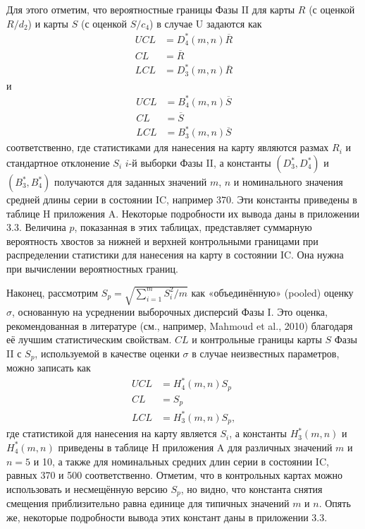 Для этого отметим, что вероятностные границы Фазы II для карты \(R\) (с оценкой \(R/d_2\)) и карты \(S\) (с оценкой \(S/c_4\)) в случае U задаются как
\[
	\begin{aligned}
		UCL &= D_4^*(m,n)\overline{R} \\
		CL &= \overline{R} \\
		LCL &= D_3^*(m,n)\overline{R}
	\end{aligned}
\]
и
\[
	\begin{aligned}
		UCL &= B_4^*(m,n)\overline{S} \\
		CL &= \overline{S} \\
		LCL &= B_3^*(m,n)\overline{S}
	\end{aligned}
\]
соответственно, где статистиками для нанесения на карту являются размах \(R_i\) и стандартное отклонение \(S_i\) \(i\)-й выборки Фазы II, а константы \((D_3^*, D_4^*)\) и \((B_3^*, B_4^*)\) получаются для заданных значений \(m\), \(n\) и номинального значения средней длины серии в состоянии IC, например 370. Эти константы приведены в таблице H приложения A. Некоторые подробности их вывода даны в приложении 3.3. Величина \(p\), показанная в этих таблицах, представляет суммарную вероятность хвостов за нижней и верхней контрольными границами при распределении статистики для нанесения на карту в состоянии IC. Она нужна при вычислении вероятностных границ.

Наконец, рассмотрим \(S_p = \sqrt{\sum_{i=1}^{m} S_i^2/m}\) как «объединённую» (pooled) оценку \(\sigma\), основанную на усреднении выборочных дисперсий Фазы I. Это оценка, рекомендованная в литературе (см., например, Mahmoud et al., 2010) благодаря её лучшим статистическим свойствам. \(CL\) и контрольные границы карты \(S\) Фазы II с \(S_p\), используемой в качестве оценки \(\sigma\) в случае неизвестных параметров, можно записать как
\begin{equation}
	\begin{aligned}
		UCL &= H_4^*(m,n)S_p \\
		CL &= S_p \\
		LCL &= H_3^*(m,n)S_p,
	\end{aligned}
	\label{eq:3.34}
\end{equation}
где статистикой для нанесения на карту является \(S_i\), а константы \(H_3^*(m,n)\) и \(H_4^*(m,n)\) приведены в таблице H приложения A для различных значений \(m\) и \(n = 5\) и 10, а также для номинальных средних длин серии в состоянии IC, равных 370 и 500 соответственно. Отметим, что в контрольных картах можно использовать и несмещённую версию \(S_p\), но видно, что константа снятия смещения приблизительно равна единице для типичных значений \(m\) и \(n\). Опять же, некоторые подробности вывода этих констант даны в приложении 3.3.

